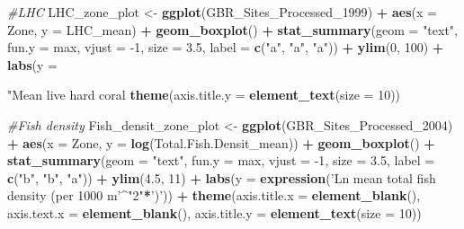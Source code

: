 \documentclass[12pt,]{article}
\newenvironment{Shaded}{\begin{snugshade}}{\end{snugshade}}
\newcommand{\CommentTok}[1]{\textcolor[rgb]{0.56,0.35,0.01}{\textit{#1}}}
\newcommand{\DataTypeTok}[1]{\textcolor[rgb]{0.13,0.29,0.53}{#1}}
\newcommand{\DecValTok}[1]{\textcolor[rgb]{0.00,0.00,0.81}{#1}}
\newcommand{\FloatTok}[1]{\textcolor[rgb]{0.00,0.00,0.81}{#1}}
\newcommand{\KeywordTok}[1]{\textcolor[rgb]{0.13,0.29,0.53}{\textbf{#1}}}
\newcommand{\NormalTok}[1]{#1}
\newcommand{\OperatorTok}[1]{\textcolor[rgb]{0.81,0.36,0.00}{\textbf{#1}}}
\newcommand{\StringTok}[1]{\textcolor[rgb]{0.31,0.60,0.02}{#1}}
\begin{document}
\begin{Shaded}
\begin{Highlighting}[]
\CommentTok{#LHC}
\NormalTok{LHC_zone_plot <-}\StringTok{ }\KeywordTok{ggplot}\NormalTok{(GBR_Sites_Processed_}\DecValTok{1999}\NormalTok{) }\OperatorTok{+}
\StringTok{  }\KeywordTok{aes}\NormalTok{(}\DataTypeTok{x =}\NormalTok{ Zone, }\DataTypeTok{y =}\NormalTok{ LHC_mean) }\OperatorTok{+}
\StringTok{  }\KeywordTok{geom_boxplot}\NormalTok{() }\OperatorTok{+}
\StringTok{  }\KeywordTok{stat_summary}\NormalTok{(}\DataTypeTok{geom =} \StringTok{"text"}\NormalTok{, }\DataTypeTok{fun.y =}\NormalTok{ max, }\DataTypeTok{vjust =} \DecValTok{-1}\NormalTok{, }\DataTypeTok{size =} \FloatTok{3.5}\NormalTok{,}
               \DataTypeTok{label =} \KeywordTok{c}\NormalTok{(}\StringTok{"a"}\NormalTok{, }\StringTok{"a"}\NormalTok{, }\StringTok{"a"}\NormalTok{)) }\OperatorTok{+}
\StringTok{  }\KeywordTok{ylim}\NormalTok{(}\DecValTok{0}\NormalTok{, }\DecValTok{100}\NormalTok{) }\OperatorTok{+}
\StringTok{  }\KeywordTok{labs}\NormalTok{(}\DataTypeTok{y =} \StringTok{"Mean live hard coral %
\StringTok{  }\KeywordTok{theme}\NormalTok{(}\DataTypeTok{axis.title.y =} \KeywordTok{element_text}\NormalTok{(}\DataTypeTok{size =} \DecValTok{10}\NormalTok{))}

\CommentTok{#Fish density}
\NormalTok{Fish_densit_zone_plot <-}\StringTok{ }\KeywordTok{ggplot}\NormalTok{(GBR_Sites_Processed_}\DecValTok{2004}\NormalTok{) }\OperatorTok{+}
\StringTok{  }\KeywordTok{aes}\NormalTok{(}\DataTypeTok{x =}\NormalTok{ Zone, }\DataTypeTok{y =} \KeywordTok{log}\NormalTok{(Total.Fish.Densit_mean)) }\OperatorTok{+}
\StringTok{  }\KeywordTok{geom_boxplot}\NormalTok{() }\OperatorTok{+}
\StringTok{  }\KeywordTok{stat_summary}\NormalTok{(}\DataTypeTok{geom =} \StringTok{"text"}\NormalTok{, }\DataTypeTok{fun.y =}\NormalTok{ max, }\DataTypeTok{vjust =} \DecValTok{-1}\NormalTok{, }\DataTypeTok{size =} \FloatTok{3.5}\NormalTok{,}
               \DataTypeTok{label =} \KeywordTok{c}\NormalTok{(}\StringTok{"b"}\NormalTok{, }\StringTok{"b"}\NormalTok{, }\StringTok{"a"}\NormalTok{)) }\OperatorTok{+}
\StringTok{  }\KeywordTok{ylim}\NormalTok{(}\FloatTok{4.5}\NormalTok{, }\DecValTok{11}\NormalTok{) }\OperatorTok{+}
\StringTok{  }\KeywordTok{labs}\NormalTok{(}\DataTypeTok{y =} \KeywordTok{expression}\NormalTok{(}\StringTok{'Ln mean total fish density (per 1000 m'}\OperatorTok{^}\StringTok{"2"}\OperatorTok{*}\StringTok{')'}\NormalTok{)) }\OperatorTok{+}
\StringTok{  }\KeywordTok{theme}\NormalTok{(}\DataTypeTok{axis.title.x =} \KeywordTok{element_blank}\NormalTok{(), }\DataTypeTok{axis.text.x =} \KeywordTok{element_blank}\NormalTok{(),}
        \DataTypeTok{axis.title.y =} \KeywordTok{element_text}\NormalTok{(}\DataTypeTok{size =} \DecValTok{10}\NormalTok{))}

}
\end{Highlighting}
\end{Shaded}
\end{document}

